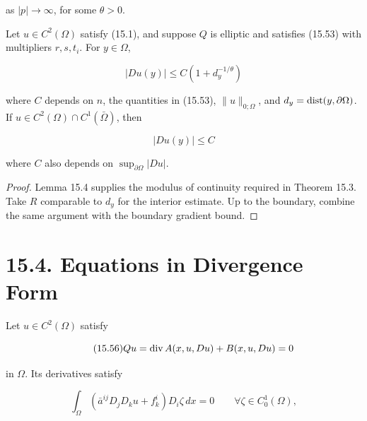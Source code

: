 as \(|p|\to\infty\), for some \(\theta>0\).

\begin{theorem}\label{gilbarg-trudinger.thm.15.5.natural-growth-gradient-bounds}
Let $u\in C^2(\Omega)$ satisfy (15.1), and suppose $Q$ is elliptic and satisfies
(15.53) with multipliers $r,s,t_i$. For $y\in\Omega$,

\begin{equation}\tag{15.54}
|Du(y)| \leq C\left(1 + d_y^{-1/\theta}\right)
\end{equation}

where $C$ depends on $n$, the quantities in (15.53), $\|u\|_{0;\Omega}$, and
$d_y=\operatorname{dist}(y,\partial\Omega)$. If $u\in C^2(\Omega)\cap C^1(\bar\Omega)$, then

\begin{equation}\tag{15.55}
|Du(y)| \leq C
\end{equation}

where $C$ also depends on $\sup_{\partial\Omega}|Du|$.
\end{theorem}
\begin{proof}
\sketch Lemma 15.4 supplies the modulus of continuity required in Theorem 15.3.
Take $R$ comparable to $d_y$ for the interior estimate. Up to the boundary, combine
the same argument with the boundary gradient bound.
\end{proof}

\bigskip

\section*{15.4. Equations in Divergence Form}

Let \(u\in C^2(\Omega)\) satisfy

\begin{equation}\tag{15.56}
Qu = \operatorname{div} A(x,u,Du) + B(x,u,Du) = 0
\end{equation}

in \(\Omega\). Its derivatives satisfy

\begin{equation}\tag{15.57}
\int_\Omega \left(\bar a^{ij}D_jD_k u + f_k^i\right)D_i\zeta\,dx = 0 \qquad \forall \zeta \in C_0^1(\Omega),
\end{equation}




